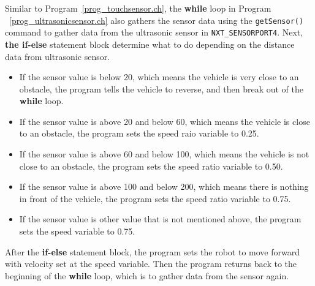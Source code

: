 \documentclass[11pt]{article}
\begin{document}
Similar to Program~\ref{prog_touchsensor.ch}, the {\bf while} loop in Program
~\ref{prog_ultrasonicsensor.ch} also gathers the sensor data using the 
{\tt getSensor()} command to gather data from the ultrasonic sensor in 
{\tt NXT\_SENSORPORT4}. Next, {\bf the if-else} statement block determine what 
to do depending on the distance data from ultrasonic sensor.
\begin{itemize}
\item If the sensor value is below 20, which means the vehicle is very close 
    to an obstacle, the program tells the vehicle to reverse, and then break 
    out of the {\bf while} loop.
\item If the sensor value is above 20 and below 60, which means the vehicle 
    is close to an obstacle, the program sets the speed raio variable to 0.25.
\item If the sensor value is above 60 and below 100, which means the vehicle 
    is not close to an obstacle, the program sets the speed ratio variable to 
    0.50.
\item If the sensor value is above 100 and below 200, which means there is 
    nothing in front of the vehicle, the program sets the speed ratio variable 
    to 0.75.
\item If the sensor value is other value that is not mentioned above, the 
    program sets the speed variable to 0.75.
\end{itemize}
After the {\bf if-else} statement block, the program sets the robot to move 
forward with velocity set at the speed variable. Then the program returns back 
to the beginning of the {\bf while} loop, which is to gather data from the 
sensor again.

\end{document}
